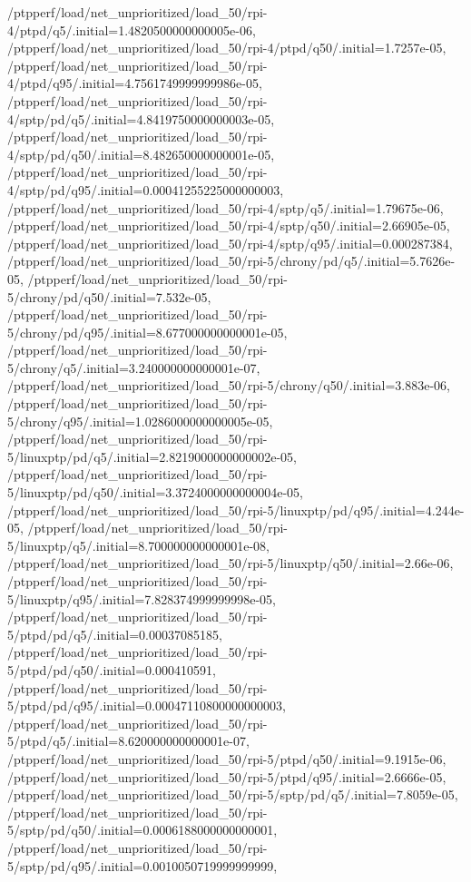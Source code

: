 {    /ptpperf/load/net_unprioritized/load_50/rpi-4/ptpd/q5/.initial=1.4820500000000005e-06,
    /ptpperf/load/net_unprioritized/load_50/rpi-4/ptpd/q50/.initial=1.7257e-05,
    /ptpperf/load/net_unprioritized/load_50/rpi-4/ptpd/q95/.initial=4.7561749999999986e-05,
    /ptpperf/load/net_unprioritized/load_50/rpi-4/sptp/pd/q5/.initial=4.8419750000000003e-05,
    /ptpperf/load/net_unprioritized/load_50/rpi-4/sptp/pd/q50/.initial=8.482650000000001e-05,
    /ptpperf/load/net_unprioritized/load_50/rpi-4/sptp/pd/q95/.initial=0.00041255225000000003,
    /ptpperf/load/net_unprioritized/load_50/rpi-4/sptp/q5/.initial=1.79675e-06,
    /ptpperf/load/net_unprioritized/load_50/rpi-4/sptp/q50/.initial=2.66905e-05,
    /ptpperf/load/net_unprioritized/load_50/rpi-4/sptp/q95/.initial=0.000287384,
    /ptpperf/load/net_unprioritized/load_50/rpi-5/chrony/pd/q5/.initial=5.7626e-05,
    /ptpperf/load/net_unprioritized/load_50/rpi-5/chrony/pd/q50/.initial=7.532e-05,
    /ptpperf/load/net_unprioritized/load_50/rpi-5/chrony/pd/q95/.initial=8.677000000000001e-05,
    /ptpperf/load/net_unprioritized/load_50/rpi-5/chrony/q5/.initial=3.240000000000001e-07,
    /ptpperf/load/net_unprioritized/load_50/rpi-5/chrony/q50/.initial=3.883e-06,
    /ptpperf/load/net_unprioritized/load_50/rpi-5/chrony/q95/.initial=1.0286000000000005e-05,
    /ptpperf/load/net_unprioritized/load_50/rpi-5/linuxptp/pd/q5/.initial=2.8219000000000002e-05,
    /ptpperf/load/net_unprioritized/load_50/rpi-5/linuxptp/pd/q50/.initial=3.3724000000000004e-05,
    /ptpperf/load/net_unprioritized/load_50/rpi-5/linuxptp/pd/q95/.initial=4.244e-05,
    /ptpperf/load/net_unprioritized/load_50/rpi-5/linuxptp/q5/.initial=8.700000000000001e-08,
    /ptpperf/load/net_unprioritized/load_50/rpi-5/linuxptp/q50/.initial=2.66e-06,
    /ptpperf/load/net_unprioritized/load_50/rpi-5/linuxptp/q95/.initial=7.828374999999998e-05,
    /ptpperf/load/net_unprioritized/load_50/rpi-5/ptpd/pd/q5/.initial=0.00037085185,
    /ptpperf/load/net_unprioritized/load_50/rpi-5/ptpd/pd/q50/.initial=0.000410591,
    /ptpperf/load/net_unprioritized/load_50/rpi-5/ptpd/pd/q95/.initial=0.00047110800000000003,
    /ptpperf/load/net_unprioritized/load_50/rpi-5/ptpd/q5/.initial=8.620000000000001e-07,
    /ptpperf/load/net_unprioritized/load_50/rpi-5/ptpd/q50/.initial=9.1915e-06,
    /ptpperf/load/net_unprioritized/load_50/rpi-5/ptpd/q95/.initial=2.6666e-05,
    /ptpperf/load/net_unprioritized/load_50/rpi-5/sptp/pd/q5/.initial=7.8059e-05,
    /ptpperf/load/net_unprioritized/load_50/rpi-5/sptp/pd/q50/.initial=0.0006188000000000001,
    /ptpperf/load/net_unprioritized/load_50/rpi-5/sptp/pd/q95/.initial=0.0010050719999999999,
}
